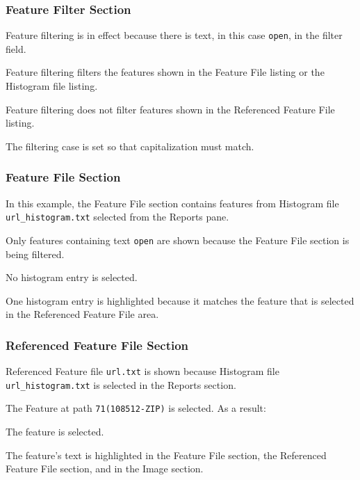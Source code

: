 \documentclass[10pt,twoside]{article}
\begin{document}
\subsubsection{Feature Filter Section}
Feature filtering is in effect because there is text, in this case \texttt{open},
in the filter field.
\begin{compactitem}
\item Feature filtering filters the features shown
in the Feature File listing or the Histogram file listing.
\item Feature filtering does not filter features shown in the Referenced Feature File listing.
\item The filtering case is set so that capitalization must match.
\end{compactitem}
\subsubsection{Feature File Section}
\begin{compactitem}
\item In this example, the Feature File section contains features
from Histogram file \texttt{url\_histogram.txt}
selected from the Reports pane.
\item Only features containing text \texttt{open} are shown
because the Feature File section is being filtered.
\item No histogram entry is selected.
\item One histogram entry is highlighted
because it matches the feature that is selected in the Referenced Feature File area.
\end{compactitem}
\subsubsection{Referenced Feature File Section}
\begin{compactitem}
\item Referenced Feature file \texttt{url.txt} is shown
because Histogram file \texttt{url\_histogram.txt} is selected in the Reports section.
\item The Feature at path \texttt{71(108512-ZIP)} is selected.
As a result:
\begin{compactitem}
\item The feature is selected.
\item The feature's text is highlighted
in the Feature File section, the Referenced Feature File section,
and in the Image section.
\end{compactitem}
\end{compactitem}
\end{document}
